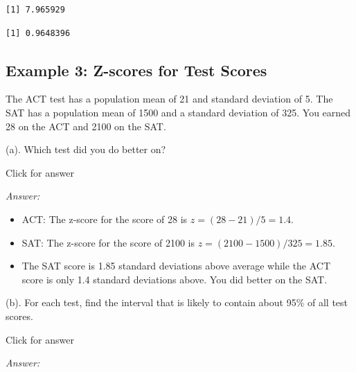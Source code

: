 \documentclass[
]{book}
\newenvironment{Shaded}{\begin{snugshade}}{\end{snugshade}}
\newcommand{\FunctionTok}[1]{\textcolor[rgb]{0.00,0.00,0.00}{#1}}
\newcommand{\NormalTok}[1]{#1}
\newcommand{\SpecialCharTok}[1]{\textcolor[rgb]{0.00,0.00,0.00}{#1}}
\providecommand{\tightlist}{%
  \setlength{\itemsep}{0pt}\setlength{\parskip}{0pt}}
\begin{document}
\begin{Shaded}
\end{Shaded}

\begin{verbatim}
[1] 7.965929
\end{verbatim}

\begin{Shaded}
\end{Shaded}

\begin{verbatim}
[1] 0.9648396
\end{verbatim}

\hypertarget{example-3-z-scores-for-test-scores}{%
\subsection{Example 3: Z-scores for Test Scores}\label{example-3-z-scores-for-test-scores}}

The ACT test has a population mean of 21 and standard deviation of 5. The SAT has a population mean of 1500 and a standard deviation of 325. You earned 28 on the ACT and 2100 on the SAT.

(a). Which test did you do better on?

Click for answer

\emph{Answer:}

\begin{itemize}
\tightlist
\item
  ACT: The z-score for the score of 28 is \(z = (28 - 21)/5 = 1.4.\)
\item
  SAT: The z-score for the score of 2100 is \(z = (2100 - 1500)/325 = 1.85.\)
\item
  The SAT score is 1.85 standard deviations above average while the ACT score is only 1.4 standard deviations above. You did better on the SAT.
\end{itemize}

(b). For each test, find the interval that is likely to contain about 95\% of all test scores.

Click for answer

\emph{Answer:}
\end{document}

